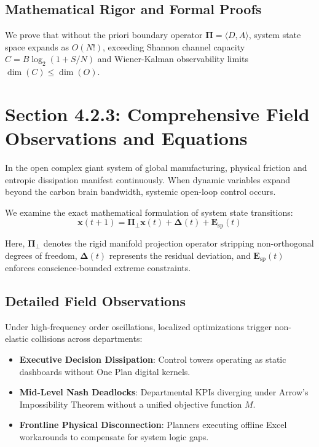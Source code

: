 \documentclass[12pt,a4paper,oneside]{book}
\begin{document}
\subsection*{Mathematical Rigor and Formal Proofs}
We prove that without the priori boundary operator $\mathbf{\Pi} = \langle D, A \rangle$, system state space expands as $O(N!)$, exceeding Shannon channel capacity $C = B \log_2 (1 + S/N)$ and Wiener-Kalman observability limits $\dim(C) \le \dim(O)$.
\clearpage
\section{Section 4.2.3: Comprehensive Field Observations and Equations}

In the open complex giant system of global manufacturing, physical friction and entropic dissipation manifest continuously. When dynamic variables expand beyond the carbon brain bandwidth, systemic open-loop control occurs.

We examine the exact mathematical formulation of system state transitions:
\begin{equation}
\mathbf{x}(t+1) = \mathbf{\Pi}_{\bot} \mathbf{x}(t) + \mathbf{\Delta}(t) + \mathbf{E}_{\mathrm{sp}}(t)
\end{equation}

Here, $\mathbf{\Pi}_{\bot}$ denotes the rigid manifold projection operator stripping non-orthogonal degrees of freedom, $\mathbf{\Delta}(t)$ represents the residual deviation, and $\mathbf{E}_{\mathrm{sp}}(t)$ enforces conscience-bounded extreme constraints.

\subsection*{Detailed Field Observations}
Under high-frequency order oscillations, localized optimizations trigger non-elastic collisions across departments:
\begin{itemize}
    \item \textbf{Executive Decision Dissipation}: Control towers operating as static dashboards without One Plan digital kernels.
    \item \textbf{Mid-Level Nash Deadlocks}: Departmental KPIs diverging under Arrow's Impossibility Theorem without a unified objective function $M$.
    \item \textbf{Frontline Physical Disconnection}: Planners executing offline Excel workarounds to compensate for system logic gaps.
\end{itemize}
\end{document}
